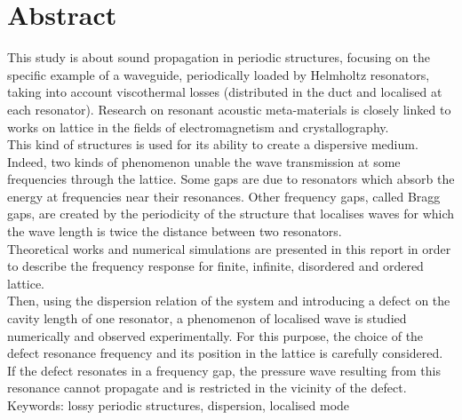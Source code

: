 \section*{Abstract}


This study is about sound propagation in periodic structures, focusing on the specific example of a waveguide, periodically loaded by Helmholtz resonators, taking into account viscothermal losses (distributed in the duct and localised at each resonator). Research on resonant acoustic meta-materials is closely linked to works on lattice in the fields of electromagnetism and crystallography.\\

This kind of structures is used for its ability to create a dispersive medium. Indeed, two kinds of phenomenon unable the wave transmission at some frequencies through the lattice. Some gaps are due to resonators which absorb the energy at frequencies near their resonances. Other frequency gaps, called Bragg gaps, are created by the periodicity of the structure that localises waves for which the wave length is twice the distance between two resonators.\\

Theoretical works and numerical simulations are presented in this report in order to describe the frequency response for finite, infinite, disordered and ordered lattice.\\


Then, using the dispersion relation of the system and introducing a defect on the cavity length of one resonator, a phenomenon of localised wave is studied numerically and observed experimentally. For this purpose, the choice of the defect resonance frequency and its position in the lattice is carefully considered. If the defect resonates in a frequency gap, the pressure wave resulting from this resonance cannot propagate and is restricted in the vicinity of the defect. \\


Keywords: lossy periodic structures, dispersion, localised mode 
